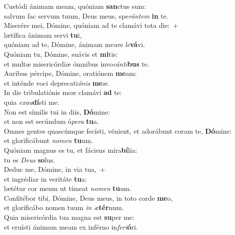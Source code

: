\evenverse Custódi ánimam meam, quóniam \textbf{san}ctus sum:~\*\\
\evenverse salvum fac servum tuum, Deus meus, spe\textit{rán}\textit{tem} \textbf{in} te.\\
\oddverse Miserére mei, Dómine, quóniam ad te clamávi tota die:~+\\
\oddverse  lætífica ánimam servi \textbf{tu}i,~\*\\
\oddverse quóniam ad te, Dómine, ánimam me\textit{am} \textit{le}\textbf{vá}vi.\\
\evenverse Quóniam tu, Dómine, suávis et \textbf{mi}tis:~\*\\
\evenverse et multæ misericórdiæ ómnibus invo\textit{cán}\textit{ti}\textbf{bus} te.\\
\oddverse Auribus pércipe, Dómine, oratiónem \textbf{me}am:~\*\\
\oddverse et inténde voci deprecati\textit{ó}\textit{nis} \textbf{me}æ.\\
\evenverse In die tribulatiónis meæ clamávi \textbf{ad} te:~\*\\
\evenverse quia \textit{e}\textit{xau}\textbf{dí}sti me.\\
\oddverse Non est símilis tui in diis, \textbf{Dó}mine:~\*\\
\oddverse et non est secúndum ó\textit{pe}\textit{ra} \textbf{tu}a.\\
\evenverse Omnes gentes quascúmque fecísti, vénient, et adorábunt coram te, \textbf{Dó}mine:~\*\\
\evenverse et glorificábunt \textit{no}\textit{men} \textbf{tu}um.\\
\oddverse Quóniam magnus es tu, et fáciens mira\textbf{bí}lia:~\*\\
\oddverse tu es \textit{De}\textit{us} \textbf{so}lus.\\
\evenverse Deduc me, Dómine, in via tua,~+\\
\evenverse  et ingrédiar in veritáte \textbf{tu}a:~\*\\
\evenverse lætétur cor meum ut tímeat \textit{no}\textit{men} \textbf{tu}um.\\
\oddverse Confitébor tibi, Dómine, Deus meus, in toto corde \textbf{me}o,~\*\\
\oddverse et glorificábo nomen tuum \textit{in} \textit{æ}\textbf{tér}num.\\
\evenverse Quia misericórdia tua magna est \textbf{su}per me:~\*\\
\evenverse et eruísti ánimam meam ex inférno in\textit{fe}\textit{ri}\textbf{ó}ri.\\
